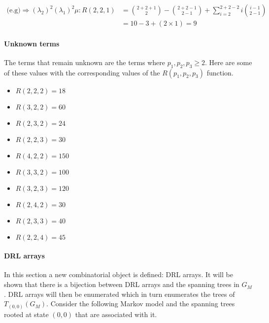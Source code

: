 \begin{align}
    \text{(e.g)} \Rightarrow (\lambda_2)^2 (\lambda_1)^2 \mu: 
    R(2,2,1) & = \binom{2+2+1}{2} - \binom{2+2-1}{2-1} + \sum_{i=2}^{2+2-2} 
    i\binom{i-1}{2-1} \nonumber \\ 
    & = 10 - 3 + (2 \times 1) = 9 \nonumber
\end{align}


\paragraph{Unknown terms}

The terms that remain unknown are the terms where \(p_1, p_2, p_3 \geq 2\). 
Here are some of these values with the corresponding values of the 
\(R(p_1,p_2,p_3)\) function.

\begin{multicols}{2}
    \begin{itemize}
        \item \(R(2,2,2) = 18\) 
        \item \(R(3,2,2) = 60\)
        \item \(R(2,3,2) = 24\)
        \item \(R(2,2,3) = 30\)
        \item \(R(4,2,2) = 150\)
        \item \(R(3,3,2) = 100\)
        \item \(R(3,2,3) = 120\)
        \item \(R(2,4,2) = 30\)
        \item \(R(2,3,3) = 40\)
        \item \(R(2,2,4) = 45\)
    \end{itemize}
\end{multicols}

\paragraph{DRL arrays}

In this section a new combinatorial object is defined: DRL arrays. 
It will be shown that there is a bijection between DRL arrays and the spanning 
trees in \(G_M\).
DRL arrays will then be enumerated which in turn enumerates the trees of 
\(T_{(0,0)}(G_M)\).
Consider the following Markov model and the spanning trees rooted at state 
\((0,0)\) that are associated with it. 

